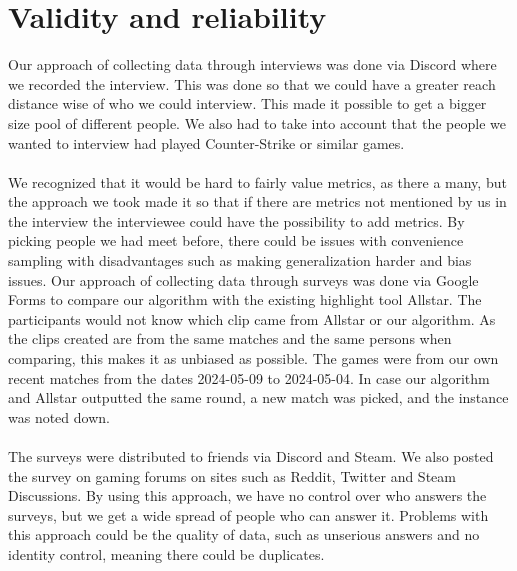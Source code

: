 \section{Validity and reliability}
Our approach of collecting data through interviews was done via \gls{Discord} where we recorded the interview. This was done so that we could have a greater reach distance wise of who we could interview. This made it possible to get a bigger size pool of different people. We also had to take into account that the people we wanted to interview had played Counter-Strike or similar games.\\\\ We recognized that it would be hard to fairly value metrics, as there a many, but the approach we took made it so that if there are metrics not mentioned by us in the interview the interviewee could have the possibility to add metrics. By picking people we had meet before, there could be issues with convenience sampling with disadvantages such as making generalization harder and bias issues. Our approach of collecting data through surveys was done via Google Forms to compare our algorithm with the existing highlight tool Allstar. The participants would not know which clip came from Allstar or our algorithm. As the clips created are from the same matches and the same persons when comparing, this makes it as unbiased as possible. The games were from our own recent matches from the dates 2024-05-09 to 
2024-05-04. In case our algorithm and Allstar outputted the same round, a new match was picked, and the instance was noted down.\\\\
The surveys were distributed to friends via Discord and Steam. We also posted the survey on gaming forums on sites such as Reddit, Twitter and Steam Discussions. By using this approach, we have no control over who answers the surveys, but we get a wide spread of people who can answer it. Problems with this approach could be the quality of data, such as unserious answers and no identity control, meaning there could be duplicates. 